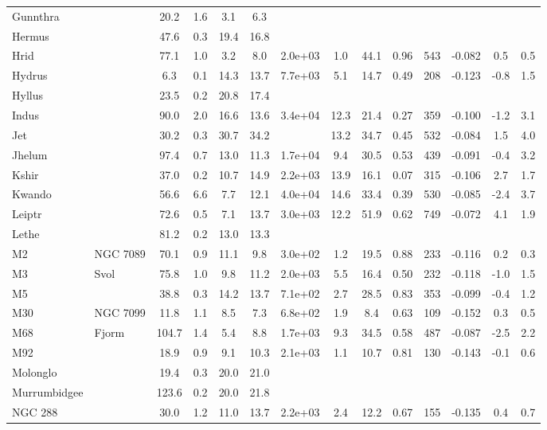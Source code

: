 \begin{tabular}{llSSSSSSSSrSSS}
Gunnthra &  & 20.2 & 1.6 & 3.1 & 6.3 &  &  &  &  &  &  &  &  \\
Hermus &  & 47.6 & 0.3 & 19.4 & 16.8 &  &  &  &  &  &  &  &  \\
Hrid &  & 77.1 & 1.0 & 3.2 & 8.0 & 2.0e+03 & 1.0 & 44.1 & 0.96 & 543 & -0.082 & 0.5 & 0.5 \\
Hydrus &  & 6.3 & 0.1 & 14.3 & 13.7 & 7.7e+03 & 5.1 & 14.7 & 0.49 & 208 & -0.123 & -0.8 & 1.5 \\
Hyllus &  & 23.5 & 0.2 & 20.8 & 17.4 &  &  &  &  &  &  &  &  \\
Indus &  & 90.0 & 2.0 & 16.6 & 13.6 & 3.4e+04 & 12.3 & 21.4 & 0.27 & 359 & -0.100 & -1.2 & 3.1 \\
Jet &  & 30.2 & 0.3 & 30.7 & 34.2 &  & 13.2 & 34.7 & 0.45 & 532 & -0.084 & 1.5 & 4.0 \\
Jhelum &  & 97.4 & 0.7 & 13.0 & 11.3 & 1.7e+04 & 9.4 & 30.5 & 0.53 & 439 & -0.091 & -0.4 & 3.2 \\
Kshir &  & 37.0 & 0.2 & 10.7 & 14.9 & 2.2e+03 & 13.9 & 16.1 & 0.07 & 315 & -0.106 & 2.7 & 1.7 \\
Kwando &  & 56.6 & 6.6 & 7.7 & 12.1 & 4.0e+04 & 14.6 & 33.4 & 0.39 & 530 & -0.085 & -2.4 & 3.7 \\
Leiptr &  & 72.6 & 0.5 & 7.1 & 13.7 & 3.0e+03 & 12.2 & 51.9 & 0.62 & 749 & -0.072 & 4.1 & 1.9 \\
Lethe &  & 81.2 & 0.2 & 13.0 & 13.3 &  &  &  &  &  &  &  &  \\
M2 & NGC 7089 & 70.1 & 0.9 & 11.1 & 9.8 & 3.0e+02 & 1.2 & 19.5 & 0.88 & 233 & -0.116 & 0.2 & 0.3 \\
M3 & Svol & 75.8 & 1.0 & 9.8 & 11.2 & 2.0e+03 & 5.5 & 16.4 & 0.50 & 232 & -0.118 & -1.0 & 1.5 \\
M5 &  & 38.8 & 0.3 & 14.2 & 13.7 & 7.1e+02 & 2.7 & 28.5 & 0.83 & 353 & -0.099 & -0.4 & 1.2 \\
M30 & NGC 7099 & 11.8 & 1.1 & 8.5 & 7.3 & 6.8e+02 & 1.9 & 8.4 & 0.63 & 109 & -0.152 & 0.3 & 0.5 \\
M68 & Fjorm & 104.7 & 1.4 & 5.4 & 8.8 & 1.7e+03 & 9.3 & 34.5 & 0.58 & 487 & -0.087 & -2.5 & 2.2 \\
M92 &  & 18.9 & 0.9 & 9.1 & 10.3 & 2.1e+03 & 1.1 & 10.7 & 0.81 & 130 & -0.143 & -0.1 & 0.6 \\
Molonglo &  & 19.4 & 0.3 & 20.0 & 21.0 &  &  &  &  &  &  &  &  \\
Murrumbidgee &  & 123.6 & 0.2 & 20.0 & 21.8 &  &  &  &  &  &  &  &  \\
NGC 288 &  & 30.0 & 1.2 & 11.0 & 13.7 & 2.2e+03 & 2.4 & 12.2 & 0.67 & 155 & -0.135 & 0.4 & 0.7 \\

\end{tabular}
